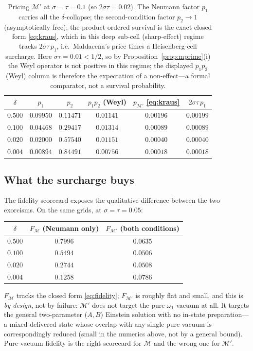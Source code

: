 \documentclass[11pt]{article}
\theoremstyle{definition}
\theoremstyle{remark}
\begin{document}
\begin{table}[ht]
\centering
\begin{tabular}{cccccc}
\toprule
$\delta$ & $p_{1}$ & $p_{2}$ & $p_{1}p_{2}$ (Weyl) &
$p_{\mathcal{M}'}$ \eqref{eq:kraus} & $2\sigma\tau\,p_{1}$ \\
\midrule
$0.500$ & $0.09950$ & $0.11471$ & $0.01141$ & $0.00196$ & $0.00199$\\
$0.100$ & $0.04468$ & $0.29417$ & $0.01314$ & $0.00089$ & $0.00089$\\
$0.020$ & $0.02000$ & $0.57540$ & $0.01151$ & $0.00040$ & $0.00040$\\
$0.004$ & $0.00894$ & $0.84491$ & $0.00756$ & $0.00018$ & $0.00018$\\
\bottomrule
\end{tabular}
\caption{Pricing $\mathcal{M}'$ at $\sigma=\tau=0.1$
(so $2\sigma\tau=0.02$). The Neumann factor $p_{1}$ carries all the
$\delta$-collapse; the second-condition factor $p_{2}\to1$
(asymptotically free); the product-ordered survival is the exact
closed form \eqref{eq:kraus}, which in this deep sub-cell
(sharp-effect) regime tracks $2\sigma\tau\,p_{1}$, i.e.\ Maldacena's price times a
Heisenberg-cell surcharge. Here $\sigma\tau=0.01<1/2$, so by
Proposition~\ref{prop:mprime}(i) the Weyl operator is not positive in
this regime; the displayed $p_{1}p_{2}$ (Weyl) column is therefore the
expectation of a non-effect---a formal comparator, not a survival
probability.}
\label{tab:mprime}
\end{table}

\subsection{What the surcharge buys}

The fidelity scorecard exposes the qualitative difference between the
two exorcisms. On the same grids, at $\sigma=\tau=0.05$:
\begin{center}
\begin{tabular}{ccc}
\toprule
$\delta$ & $F_{\mathcal{M}}$ (Neumann only) & $F_{\mathcal{M}'}$ (both conditions) \\
\midrule
$0.500$ & $0.7996$ & $0.0635$ \\
$0.100$ & $0.5494$ & $0.0506$ \\
$0.020$ & $0.2744$ & $0.0508$ \\
$0.004$ & $0.1258$ & $0.0786$ \\
\bottomrule
\end{tabular}
\end{center}
$F_{\mathcal{M}}$ tracks the closed form \eqref{eq:fidelity}; $F_{\mathcal{M}'}$ is
roughly flat and small, and this is \emph{by design}, not by failure:
$\mathcal{M}'$ does not target the pure $\omega_{1}$ vacuum at all. It targets
the general two-parameter ($A,B$) Einstein solution with no in-state
preparation---a mixed delivered state whose overlap with any single
pure vacuum is correspondingly reduced (small in the numerics above,
not by a general bound). Pure-vacuum fidelity is the right
scorecard for $\mathcal{M}$ and the wrong one for $\mathcal{M}'$.
\end{document}

